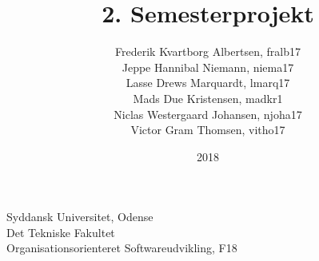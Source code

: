 \documentclass[../main.tex]{subfiles}
\title{2. Semesterprojekt}
\author{
    Frederik Kvartborg Albertsen, fralb17\\
    Jeppe Hannibal Niemann, niema17\\
    Lasse Drews Marquardt, lmarq17\\
    Mads Due Kristensen, madkr1\\
    Niclas Westergaard Johansen, njoha17\\
    Victor Gram Thomsen, vitho17\\
}
\date{2018}
\begin{document}
  \clearpage\maketitle
  \thispagestyle{empty}

  \noindent
  Syddansk Universitet, Odense\\
  Det Tekniske Fakultet\\
  Organisationsorienteret Softwareudvikling, F18

  \newpage
\end{document}
